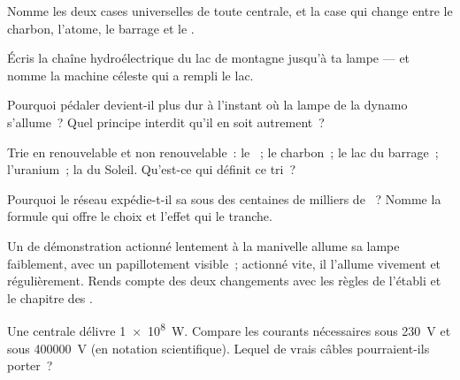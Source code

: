 \begin{exercise}[$\star$]\label{exo:g9:alternator:4}
Nomme les deux cases universelles de toute centrale, et la case qui
change entre le charbon, l'atome, le barrage et le .
\end{exercise}

\begin{exercise}[$\star$]\label{exo:g9:alternator:5}
Écris la chaîne hydroélectrique du lac de montagne jusqu'à ta lampe
--- et nomme la machine céleste qui a rempli le lac.
\end{exercise}

\begin{exercise}[$\star$]\label{exo:g9:alternator:6}
Pourquoi pédaler devient-il plus dur à l'instant où la lampe de la
dynamo s'allume~? Quel principe interdit qu'il en soit autrement~?
\end{exercise}

\begin{exercise}[$\star$]\label{exo:g9:alternator:7}
Trie en renouvelable et non renouvelable~: le ~; le charbon~; le
lac du barrage~; l'uranium~; la  du Soleil. Qu'est-ce qui
définit ce tri~?
\end{exercise}

\begin{exercise}[$\star$]\label{exo:g9:alternator:8}
Pourquoi le réseau expédie-t-il sa  sous des centaines de
milliers de ~? Nomme la formule qui offre le choix et l'effet qui
le tranche.
\end{exercise}

\begin{exercise}[$\star\star$]\label{exo:g9:alternator:9}
Un  de démonstration actionné lentement à la manivelle
allume sa lampe faiblement, avec un papillotement visible~; actionné
vite, il l'allume vivement et régulièrement. Rends compte des deux
changements avec les règles de l'établi et le chapitre des
.
\end{exercise}

\begin{exercise}[$\star\star$]\label{exo:g9:alternator:10}
Une centrale délivre \qty{1e8}{W}. Compare les courants nécessaires
sous \qty{230}{V} et sous \qty{400000}{V} (en notation
scientifique). Lequel de vrais câbles pourraient-ils porter~?
\end{exercise}

